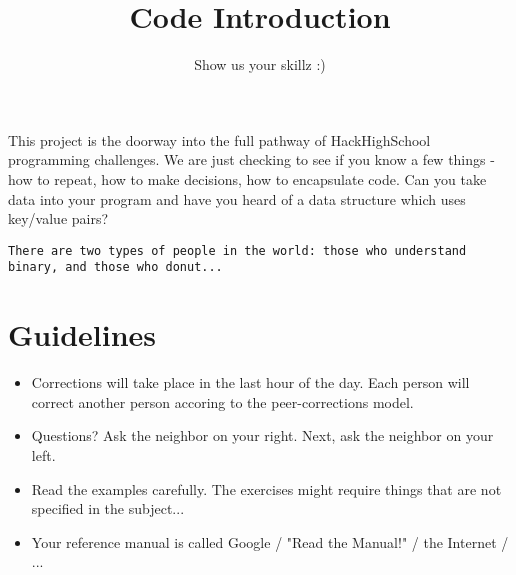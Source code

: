 \documentclass{42-en}
\begin{document}
\title{Code Introduction}
\subtitle{Show us your skillz :)}


\summary
{
This project is the doorway into the full pathway of HackHighSchool programming challenges. We are just checking to see if you know a few things - how to repeat, how to make decisions, how to encapsulate code. Can you take data into your program and have you heard of a data structure which uses key/value pairs?

\texttt {There are two types of people in the world: those who understand binary, and those who donut...}
}

\maketitle

\tableofcontents



\chapter{Guidelines}

\begin{itemize}

  \item Corrections will take place in the last hour of the day. Each person will correct another person accoring to the peer-corrections model.
 
  \item Questions? Ask the neighbor on your right. Next, ask the neighbor on your left.
  
  \item Read the examples carefully. The exercises might require things that are not specified in the subject...

  \item Your reference manual is called Google / "Read the Manual!" / the Internet / ...

\end{itemize}
\end{document}
